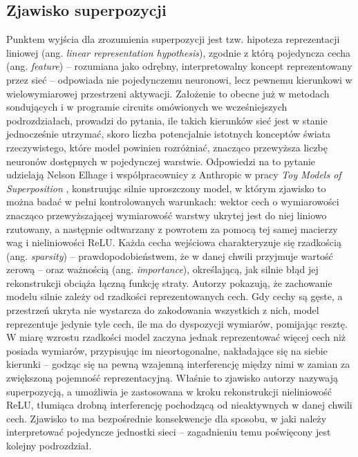 \subsection{Zjawisko superpozycji}
\label{sec:zjawisko_superpozycji}
Punktem wyjścia dla zrozumienia superpozycji jest tzw. hipoteza reprezentacji liniowej (ang. \textit{linear representation hypothesis}), zgodnie z którą pojedyncza cecha (ang. \textit{feature}) -- rozumiana jako odrębny, interpretowalny koncept reprezentowany przez sieć -- odpowiada nie pojedynczemu neuronowi, lecz pewnemu kierunkowi w wielowymiarowej przestrzeni aktywacji. Założenie to obecne już w metodach sondujących i w programie circuits omówionych we wcześniejszych podrozdziałach, prowadzi do pytania, ile takich kierunków sieć jest w stanie jednocześnie utrzymać, skoro liczba potencjalnie istotnych konceptów świata rzeczywistego, które model powinien rozróżniać, znacząco przewyższa liczbę neuronów dostępnych w pojedynczej warstwie. \newline
Odpowiedzi na to pytanie udzielają Nelson Elhage i współpracownicy z Anthropic w pracy \textit{Toy Models of Superposition} \cite{elhage_2022_toy_models_of_superposition}, konstruując silnie uproszczony model, w którym zjawisko to można badać w pełni kontrolowanych warunkach: wektor cech o wymiarowości znacząco przewyższającej wymiarowość warstwy ukrytej jest do niej liniowo rzutowany, a następnie odtwarzany z powrotem za pomocą tej samej macierzy wag i nieliniowości ReLU. Każda cecha wejściowa charakteryzuje się rzadkością (ang. \textit{sparsity}) -- prawdopodobieństwem, że w danej chwili przyjmuje wartość zerową -- oraz ważnością (ang. \textit{importance}), określającą, jak silnie błąd jej rekonstrukcji obciąża łączną funkcję straty. \newline
Autorzy pokazują, że zachowanie modelu silnie zależy od rzadkości reprezentowanych cech. Gdy cechy są gęste, a przestrzeń ukryta nie wystarcza do zakodowania wszystkich z nich, model reprezentuje jedynie tyle cech, ile ma do dyspozycji wymiarów, pomijając resztę. W miarę wzrostu rzadkości model zaczyna jednak reprezentować więcej cech niż posiada wymiarów, przypisując im nieortogonalne, nakładające się na siebie kierunki -- godząc się na pewną wzajemną interferencję między nimi w zamian za zwiększoną pojemność reprezentacyjną. Właśnie to zjawisko autorzy nazywają superpozycją, a umożliwia je zastosowana w kroku rekonstrukcji nieliniowość ReLU, tłumiąca drobną interferencję pochodzącą od nieaktywnych w danej chwili cech. \newline
Zjawisko to ma bezpośrednie konsekwencje dla sposobu, w jaki należy interpretować pojedyncze jednostki sieci -- zagadnieniu temu poświęcony jest kolejny podrozdział.
